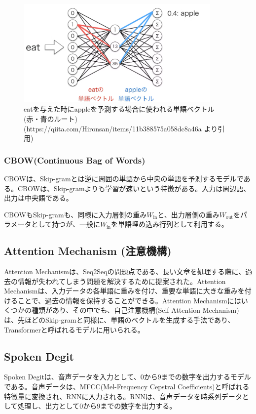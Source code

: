 \documentclass{ltjsarticle}
\begin{document}
\begin{figure}[htbp]
  \centering
  \includegraphics[width=10cm]{./capture/Skip-gram_3.png}
  \caption{eatを与えた時にappleを予測する場合に使われる単語ベクトル (赤・青のルート) (https://qiita.com/Hironsan/items/11b388575a058dc8a46a より引用)}
  \label{fig:Skip-gram_3}
\end{figure}

\subsubsection{CBOW(Continuous Bag of Words)}
CBOWは、Skip-gramとは逆に周囲の単語から中央の単語を予測するモデルである。CBOWは、Skip-gramよりも学習が速いという特徴がある。入力は周辺語、出力は中央語である。

CBOWもSkip-gramも、同様に入力層側の重み$W_{\text{in}}$と、出力層側の重み$W_{\text{out}}$をパラメータとして持つが、一般に$W_{\text{in}}$を単語埋め込み行列として利用する。


\subsection{Attention Mechanism (注意機構)}
Attention Mechanismは、Seq2Seqの問題点である、長い文章を処理する際に、過去の情報が失われてしまう問題を解決するために提案された。Attention Mechanismは、入力データの各単語に重みを付け、重要な単語に大きな重みを付けることで、過去の情報を保持することができる。Attention Mechanismにはいくつかの種類があり、その中でも、自己注意機構(Self-Attention Mechanism)は、先ほどのSkip-gramと同様に、単語のベクトルを生成する手法であり、Transformerと呼ばれるモデルに用いられる。

\subsection{Spoken Degit}
Spoken Degitは、音声データを入力として、0から9までの数字を出力するモデルである。音声データは、MFCC(Mel-Frequency Cepstral Coefficients)と呼ばれる特徴量に変換され、RNNに入力される。RNNは、音声データを時系列データとして処理し、出力として0から9までの数字を出力する。
\end{document}

